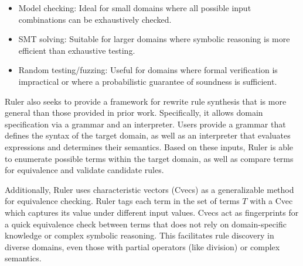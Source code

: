 \documentclass[acmsmall,screen,nonacm]{acmart}
\begin{document}
\begin{itemize}
    \item Model checking: Ideal for small domains where all possible input combinations can be exhaustively checked.

    \item SMT solving: Suitable for larger domains where symbolic reasoning is more efficient than exhaustive testing.

    \item Random testing/fuzzing: Useful for domains where formal verification is impractical or where a probabilistic guarantee of soundness is sufficient.
\end{itemize}

Ruler also seeks to provide a framework for rewrite rule synthesis that is more general than those provided in prior work. Specifically, it allows domain specification via a grammar and an interpreter. Users provide a grammar that defines the syntax of the target domain, as well as an interpreter that evaluates expressions and determines their semantics. Based on these inputs, Ruler is able to enumerate possible terms within the target domain, as well as compare terms for equivalence and validate candidate rules.

Additionally, Ruler uses characteristic vectors (Cvecs) as a generalizable method for equivalence checking. Ruler tags each term in the set of terms $T$ with a Cvec which captures its value under different input values. Cvecs act as fingerprints for a quick equivalence check between terms that does not rely on domain-specific knowledge or complex symbolic reasoning. This facilitates rule discovery in diverse domains, even those with partial operators (like division) or complex semantics.



\end{document}
